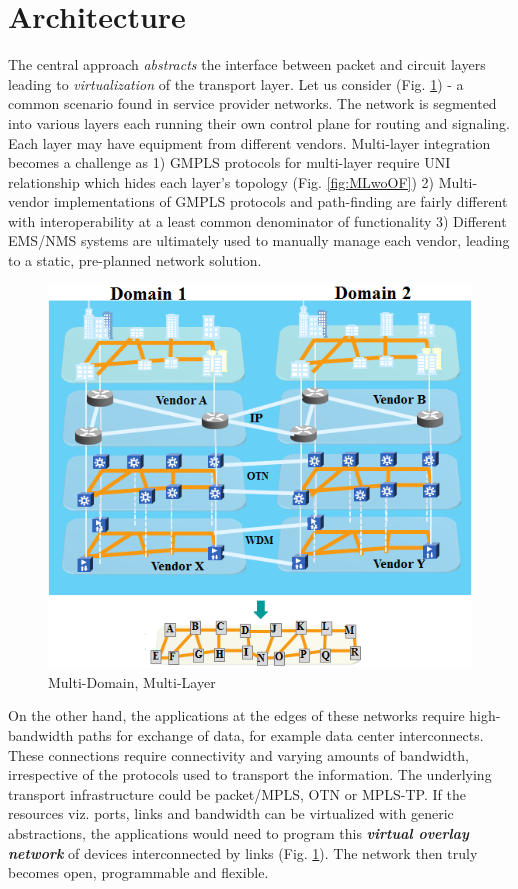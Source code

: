 \documentclass{sig-alternate-10pt}
\begin{document}
\section{Architecture}
\label{sec:arch}
	The central approach  \emph{abstracts}  the interface between packet and circuit layers leading to \emph{virtualization}
	of the transport layer. Let us consider (Fig. \ref{fig:MDL}) - a common scenario found in service provider networks. The network is segmented into
	various layers each running their own control plane for routing and signaling. Each layer may have equipment from different vendors. Multi-layer
	integration becomes a challenge as 1) GMPLS protocols for multi-layer require UNI relationship which hides each layer's topology (Fig. \ref{fig:MLwoOF})
	2) Multi-vendor implementations of GMPLS protocols and path-finding are fairly different with interoperability at a least common denominator of functionality 
	3) Different EMS/NMS systems are ultimately used to manually manage each vendor, leading to a static, pre-planned network solution. \\

\begin{figure}[htb]
	\centering
	\includegraphics[scale=0.50]{MultiDomainLayer.png}
	\caption{Multi-Domain, Multi-Layer}
	\label{fig:MDL}
	\end{figure}
	
	On the other hand, the applications at the edges of these networks require high-bandwidth paths for exchange of data, for example data center interconnects.
	These connections require connectivity and varying amounts of bandwidth, irrespective of the protocols used to transport the information. The underlying
	transport infrastructure could be packet/MPLS, OTN or MPLS-TP. If the resources viz. ports, links and bandwidth can be virtualized with generic abstractions, 
	the applications would need to program this \emph{\bf virtual overlay network} of devices interconnected by links (Fig. \ref{fig:MDL}). The network then truly becomes open, 
	programmable and flexible. \\
		
\end{document}
